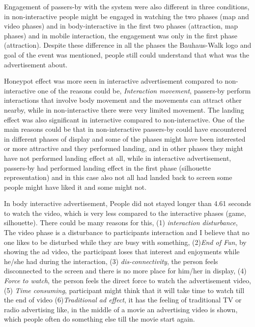 Engagement of passers-by with the system were also different in three conditions, in non-interactive people might be engaged in watching the two phases (map and video phases) and in body-interactive in the first two phases (attraction, map phases) and in mobile interaction, the engagement was only in the first phase (attraction). Despite these difference in all the phases the Bauhaus-Walk logo and goal of the event was mentioned, people still could understand that what was the advertisement about.

Honeypot effect was more seen in interactive advertisement compared to non-interactive one of the reasons could be, \emph{Interaction movement}, passers-by perform interactions that involve body movement and the movements can attract other nearby, while in non-interactive there were very limited movement. The landing effect was also significant in interactive compared to non-interactive. One of the main reasons could be that in non-interactive passers-by could have encountered in different phases of display and some of the phases might have been interested or more attractive and they performed landing, and in other phases they might have not performed landing effect at all, while in interactive advertisement, passers-by had performed landing effect in the first phase (silhouette representation) and in this case also not all had landed back to screen some people might have liked it and some might not.

In body interactive advertisement, People did not stayed longer than 4.61 seconds to watch the video, which is very less compared to the interactive phases (game, silhouette). There could be many reasons for this, (1) \emph{interaction disturbance}, The video phase is a disturbance to participants interaction and I believe that no one likes to be disturbed while they are busy with something, (2)\emph{End of Fun}, by showing the ad video, the participant loses that interest and enjoyments while he/she had during the interaction, (3) \emph{dis-connectivity}, the person feels disconnected to the screen and there is no more place for him/her in display, (4) \emph{Force to watch}, the person feels the direct force to watch the advertisement video, (5) \emph{Time consuming}, participant might think that it will take time to watch till the end of video  (6)\emph{Traditional ad effect}, it has the feeling of traditional TV or radio advertising like, in the middle of a movie an advertising video is shown, which people often do something else till the movie start again.


